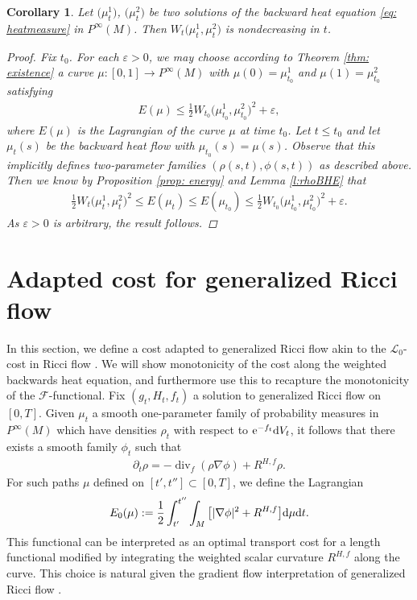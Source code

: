 \documentclass[pdftex]{sigma}
\numberwithin{equation}{section}
\newtheorem{cor}[thm]{Corollary}
\newcommand{\del}{\partial}
\newcommand{\N}{\nabla}
\newcommand{\FF}{\mathcal F}
\newcommand{\LL}{\mathcal L}
\DeclareMathOperator{\divg}{div}
\begin{document}
\begin{cor} \label{c:WDM} Let $\big(\mu^1_t\big)$, $\big(\mu^2_t\big)$ be two solutions of the backward heat equation \eqref{eq: heatmeasure}
in $P^\infty(M)$. Then $W_{t}\big(\mu^1_t,\mu^2_t\big)$ is nondecreasing in $t$.
\begin{proof}
 Fix $t_0$. For each $\varepsilon>0$, we may choose according to Theorem \ref{thm: existence} a curve $\mu\colon [0,1]\to P^\infty(M)$ with $\mu(0)=\mu^1_{t_0}$ and $\mu(1)=\mu^2_{t_0}$ satisfying
 \begin{align*}
 E(\mu)\leq \frac12 W_{t_0}\big(\mu^1_{t_0},\mu^2_{t_0}\big)^2+\varepsilon,
 \end{align*}
 where $E(\mu)$ is the Lagrangian of the curve $\mu$ at time $t_0$.
 Let $t\leq t_0$ and let $\mu_t(s)$ be the backward heat flow with $\mu_{t_0}(s)=\mu(s)$. Observe that this implicitly defines two-parameter families $(\rho(s,t), \phi(s,t))$ as described above. Then we know by Proposition \ref{prop: energy} and Lemma \ref{l:rhoBHE} that
 \begin{align*}
 \frac12 W_{t}\big(\mu^1_t,\mu^2_t\big)^2\leq E(\mu_t)\leq E(\mu_{t_0})\leq \frac12 W_{t_0}\big(\mu^1_{t_0},\mu^2_{t_0}\big)^2+\varepsilon.
 \end{align*}
 As $\varepsilon > 0$ is arbitrary, the result follows.
\end{proof}
\end{cor}

\section{Adapted cost for generalized Ricci flow}

In this section, we define a cost adapted to generalized Ricci flow akin to the $\LL_0$-cost in Ricci flow \cite{LottOTPRV}. We will show monotonicity of the cost along the weighted backwards heat equation, and furthermore use this to recapture the monotonicity of the $\FF$-functional. Fix $(g_t, H_t, f_t)$ a solution to generalized Ricci flow on $[0,T]$. Given $\mu_t$ a smooth one-parameter family of probability measures in $P^\infty(M)$ which have densities $\rho_t$ with respect to ${\rm e}^{-f_t} {\rm d}V_t$, it follows that there exists a smooth family $\phi_t$ such that
\begin{align} \label{eq: conteq}
 \del_t\rho=-\divg_f(\rho\N\phi)+R^{H,f}\rho.
\end{align}
For such paths $\mu$ defined on $[t',t''] \subset [0,T]$, we define the Lagrangian
\begin{align*}
E_0(\mu):=\frac12\int_{t'}^{t''}\int_M \big[ |\N\phi|^2+R^{H,f} \big] {\rm d}\mu {\rm d}t.
\end{align*}
This functional can be interpreted as an optimal transport cost for a length functional modified by integrating the weighted scalar curvature $R^{H,f}$ along the curve. This choice is natural given the gradient flow interpretation of generalized Ricci flow \cite{OSW}.
\end{document}
